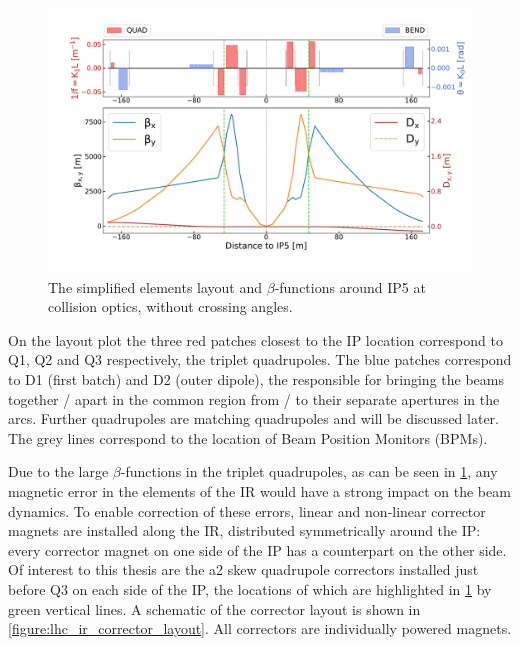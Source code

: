 \begin{figure}[!hbt]
  \centering
  \includegraphics*[width=0.99\linewidth]{Figures/Optics_Measurements_Corrections_at_LHC/lhc_ir5_zoomed.pdf}
  \caption{The simplified elements layout and \(\beta\)-functions around IP\num{5} at collision optics, without crossing angles.}
  \label{figure:lhc_ir5_zoomed}
\end{figure}

On the layout plot the three \textcolor{latwiss_red}{red patches} closest to the IP location correspond to Q\num{1}, Q\num{2} and Q\num{3} respectively, the triplet quadrupoles.
The \textcolor{latwiss_blue}{blue patches} correspond to D\num{1} (first batch) and D\num{2} (outer dipole), the  responsible for bringing the beams together / apart in the common region from / to their separate apertures in the arcs.
Further quadrupoles are matching quadrupoles and will be discussed later.
The grey lines correspond to the location of Beam Position Monitors (BPMs).

Due to the large \(\beta\)-functions in the triplet quadrupoles, as can be seen in \cref{figure:lhc_ir5_zoomed}, any magnetic error in the elements of the IR would have a strong impact on the beam dynamics.
To enable correction of these errors, linear and non-linear corrector magnets are installed along the IR, distributed symmetrically around the IP: every corrector magnet on one side of the IP has a counterpart on the other side.
Of interest to this thesis are the a\num{2} skew quadrupole correctors installed just before Q\num{3} on each side of the IP, the locations of which are highlighted in \cref{figure:lhc_ir5_zoomed} by green vertical lines.
A schematic of the corrector layout is shown in \cref{figure:lhc_ir_corrector_layout}.
All correctors are individually powered magnets.

